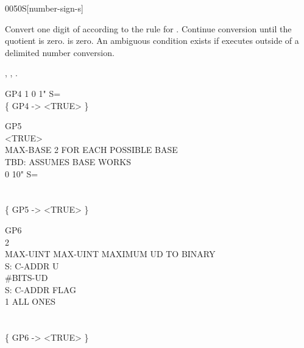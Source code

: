 \begin{worddef}[numS]{0050}{\num{}S}[number-sign-s]
\item {}

	Convert one digit of  according to the rule for
	. Continue conversion until the quotient is zero.
	 is zero. An ambiguous condition exists if
	 executes outside of a  
	delimited number conversion.

\see {},
	,
	.

	\begin{defer}
	\testing
		\word{:} GP4   1 0    1" S= \word{;} \\
		\{ GP4 -> <TRUE> \}

		\word{:} GP5 \\
		\tab {}  <TRUE> \\
		\tab MAX-BASE  2 		\tab[2]  FOR EACH POSSIBLE BASE \\
		\tab[2]   \word{!}	\tab[4.7]  TBD: ASSUMES BASE WORKS \\
		\tab[3]  0     10" S=  \\
		\tab    {} \\
		\tab    {}  \word{!} \word{;} \\
		\{ GP5 -> <TRUE> \}

		\word{:} GP6 \\
		\tab	{}    2  \word{!} \\
		\tab	MAX-UINT MAX-UINT   	\tab[2]	   MAXIMUM UD TO BINARY \\
		\tab	{}  \word{!}								\tab[10.9]  S: C-ADDR U \\
		\tab	{} \#BITS-UD \word{=}  \\
		 														\tab[13.4]   S: C-ADDR FLAG \\
		\tab[2]		  \word{[CHAR]} 1 \word{=} 	\tab[2.5]  ALL ONES \\
		\tab[2]		   \\
		\tab	{}   \word{;} \\
		\{ GP6 -> <TRUE> \}


\end{defer}
\end{worddef}
